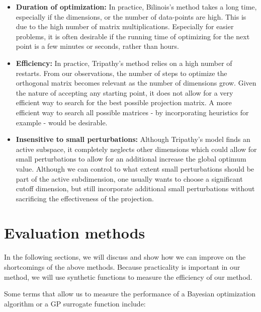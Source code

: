 \begin{itemize}

\item \textbf{Duration of optimization:} In practice, Bilinois's method takes a long time, especially if the dimensions, or the number of data-points are high. This is due to the high number of matrix multiplications. 
Especially for easier problems, it is often desirable if the running time of optimizing for the next point is a few minutes or seconds, rather than hours.

\item \textbf{Efficiency:} In practice, Tripathy's method relies on a high number of restarts.
From our observations, the number of steps to optimize the orthogonal matrix becomes relevant as the number of dimensions grow.
Given the nature of accepting any starting point, it does not allow for a very efficient way to search for the best possible projection matrix.
A more efficient way to search all possible matrices - by incorporating heuristics for example - would be desirable.

\item \textbf{Insensitive to small perturbations:} Although Tripathy's model finds an active subspace, it completely neglects other dimensions which could allow for small perturbations to allow for an additional increase the global optimum value.
Although we can control to what extent small perturbations should be part of the active subdimension, one usually wants to choose a significant cutoff dimension, but still incorporate additional small perturbations without sacrificing the effectiveness of the projection.

\end{itemize}

\section{Evaluation methods}
In the following sections, we will discuss and show how we can improve on the shortcomings of the above methods.
Because practicality is important in our method, we will use synthetic functions to measure the efficiency of our method.

Some terms that allow us to measure the performance of a Bayesian optimization algorithm or a GP surrogate function include:

